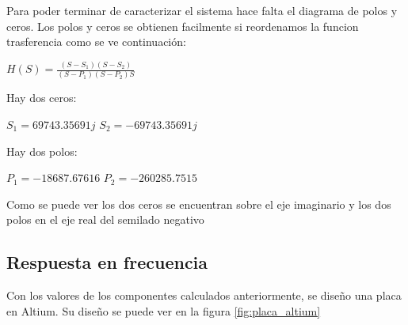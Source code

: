 \documentclass[12pt,a4paper]{article}
\begin{document}
Para poder terminar de caracterizar el sistema hace falta el diagrama de polos y ceros. Los polos y ceros
se obtienen facilmente si reordenamos la funcion trasferencia como se ve continuación:

\begin{center}
    $H(S) = \frac{(S-S_{1})(S-S_{2})}{(S-P_{1})(S-P_{2})S}$  \\
\end{center}

Hay dos ceros:
\begin{center}
    $S_{1}=69743.35691j $
    $S_{2}=-69743.35691j $
    \end{center}

Hay dos polos:

\begin{center}
    $P_{1}=-18687.67616$
    $P_{2}=-260285.7515$
\end{center}

Como se puede ver los dos ceros se encuentran sobre el eje imaginario y los dos polos en el eje real del
semilado negativo


\begin{center}
    \end{center}

\subsection{Respuesta en frecuencia}
Con los valores de los componentes calculados anteriormente, se diseño una placa en Altium. Su diseño se 
puede ver en la figura \ref{fig:placa_altium}
\end{document}
